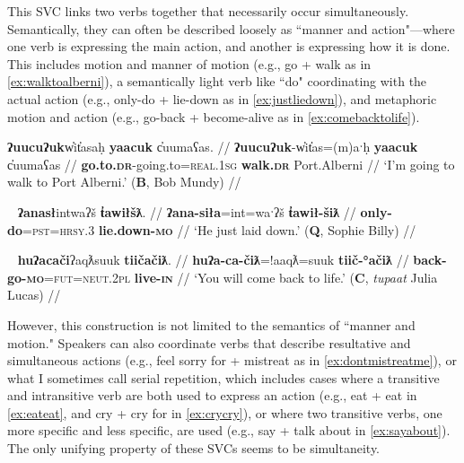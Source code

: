 \vspace{10pt}

This SVC links two verbs together that necessarily occur simultaneously. Semantically, they can often be described loosely as ``manner and action"---where one verb is expressing the main action, and another is expressing how it is done. This includes motion and manner of motion (e.g., go + walk as in \ref{ex:walktoalberni}), a semantically light verb like ``do" coordinating with the actual action (e.g., only-do + lie-down as in \ref{ex:justliedown}), and metaphoric motion and action (e.g., go-back + become-alive as in \ref{ex:comebacktolife}).

\ex \label{ex:walktoalberni}
\begingl
\glpreamble \textbf{ʔuucuʔuk}w̓it̓asaḥ \textbf{yaacuk} c̓uumaʕas. //
\gla \textbf{ʔuucuʔuk}-w̓it̓as=(m)aˑḥ \textbf{yaacuk} c̓uumaʕas //
\glb \textbf{go.to.\textsc{dr}}-going.to=\textsc{real.1sg} \textbf{walk.\textsc{dr}} Port.Alberni //
\glft `I'm going to walk to Port Alberni.' (\textbf{B}, Bob Mundy) //
\endgl
\xe

\ex~ \label{ex:justliedown}
\begingl
\glpreamble \textbf{ʔanasł}intwaʔš \textbf{t̓awiłšƛ}. //
\gla \textbf{ʔana-siła}=int=waˑʔš \textbf{t̓awił-šiƛ} //
\glb \textbf{only-do}=\textsc{pst}=\textsc{hrsy.3} \textbf{lie.down-\textsc{mo}} //
\glft `He just laid down.' (\textbf{Q}, Sophie Billy) //
\endgl
\xe

\begin{comment}
\ex~ \label{ex:goaheadwent}
\begingl
\glpreamble nay̓iiʔak̓aƛin \textbf{kuw̓iła} \textbf{wałaak}. //
\gla nay̓iiʔak=!aƛ=(m)in \textbf{kuw̓iła} \textbf{wałaak} //
\glb immediately=\textsc{now}=\textsc{real.1pl} \textbf{go.ahead} \textbf{go.to.\textsc{dr}} //
\glft `We immediately went ahead and went.' (\textbf{B}, Marjorie Touchie) //
\endgl
\xe
\end{comment}

\ex~ \label{ex:comebacktolife}
\begingl
\glpreamble \textbf{huʔacači}ʔaqƛsuuk \textbf{tiičačiƛ}. //
\gla \textbf{huʔa-ca-čiƛ}=!aaqƛ=suuk \textbf{tiič-°ačiƛ} //
\glb \textbf{back-go-\textsc{mo}}=\textsc{fut}=\textsc{neut.2pl} \textbf{live-\textsc{in}} //
\glft `You will come back to life.' (\textbf{C}, \textit{tupaat} Julia Lucas) //
\endgl
\xe

However, this construction is not limited to the semantics of ``manner and motion." Speakers can also coordinate verbs that describe resultative and simultaneous actions (e.g., feel sorry for + mistreat as in \ref{ex:dontmistreatme}), or what I sometimes call serial repetition, which includes cases where a transitive and intransitive verb are both used to express an action (e.g., eat + eat in \ref{ex:eateat}, and cry + cry for in \ref{ex:crycry}), or where two transitive verbs, one more specific and less specific, are used (e.g., say + talk about in \ref{ex:sayabout}). The only unifying property of these SVCs seems to be simultaneity.

